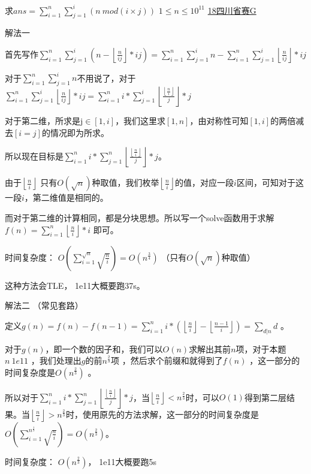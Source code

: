 

\vbox{}

\begin{example}
求$ans =\sum^n_{i=1}\sum^i_{j=1} (n\  mod (i \times j))$     \quad     $1\le n \le 10^{11}$   \quad 
\href{https://www.oj.swust.edu.cn/contest/problem/1253-G}{18四川省赛G}
\end{example}


\begin{solution}
{\heiti \color{red} 解法一}

首先写作$\sum^n_{i=1}\sum^i_{j=1} (n-\left \lfloor \frac{n}{ij} \right \rfloor*ij)=\sum^n_{i=1}\sum^i_{j=1} n-\sum^n_{i=1}\sum^i_{j=1}\left \lfloor \frac{n}{ij} \right \rfloor*ij $      

对于$\sum^n_{i=1}\sum^i_{j=1} n$不用说了，对于$\sum^n_{i=1}\sum^i_{j=1}\left \lfloor \frac{n}{ij} \right \rfloor*ij =\sum^n_{i=1}i*\sum^i_{j=1}\left \lfloor\frac{\left \lfloor \frac{n}{i} \right \rfloor} {j}\right \rfloor*j$ 

对于第二维，所求是j$\in [1,i]$，我们这里求$[1,n]$，由对称性可知$[1,i]$的两倍减去$[i=j]$的情况即为所求。

所以现在目标是$\sum^n_{i=1}i*\sum^n_{j=1}\left \lfloor\frac{\left \lfloor \frac{n}{i} \right \rfloor} {j}\right \rfloor*j$。 

由于$\left \lfloor \frac{n}{i} \right \rfloor$ 只有$O(\sqrt{n})$种取值，我们枚举$\left \lfloor \frac{n}{i} \right \rfloor$的值，对应一段$i$区间，可知对于这一段$i$，第二维值是相同的。

而对于第二维的计算相同，都是分块思想。所以写一个solve函数用于求解$f(n)=\sum_{i=1}^{n}\left \lfloor \frac{n}{i} \right \rfloor*i$ 即可。 

{\heiti 时间复杂度：  $O(\sum_{i=1}^{\sqrt{n}}\sqrt{\frac{n}{i}})=O(n^{\frac{3}{4}})$  （只有$O(\sqrt{n})$种取值）         }

这种方法会TLE，      1e11大概要跑37s。

{\heiti \color{red} 解法二  （常见套路）}   

定义$g(n)=f(n)-f(n-1)=\sum_{i=1}^{n}i* (\left \lfloor \frac{n}{i}\right \rfloor-\left \lfloor \frac{n-1}{i} \right \rfloor)=\sum_{d|n}d$ 。   

对于$g(n)$，即一个数的因子和，我们可以$O(n)$求解出其前$n$项，对于本题$n \ 1e11$ ，我们处理出$g$的前$n^{\frac{2}{3}}$项 ，然后求个前缀和就得到了$f(n)$ ，这一部分的时间复杂度是$O(n^\frac{2}{3})$  。  

所以对于$\sum^n_{i=1}i*\sum^n_{j=1}\left \lfloor\frac{\left \lfloor \frac{n}{i} \right \rfloor} {j}\right \rfloor*j$，当$\left \lfloor \frac{n}{i}\right \rfloor<n^\frac{2}{3}$时，可以$O(1)$得到第二层结果。当$\left \lfloor \frac{n}{i}\right \rfloor>n^{\frac{2}{3}}$时，使用原先的方法求解，这一部分的时间复杂度是$O(\sum_{i=1}^{n^\frac{1}{3}}\sqrt{\frac{n}{i}})=O(n^\frac{2}{3})$。

{\heiti 时间复杂度： $O(n^\frac{2}{3})$，       1e11大概要跑5s}
\end{solution}

